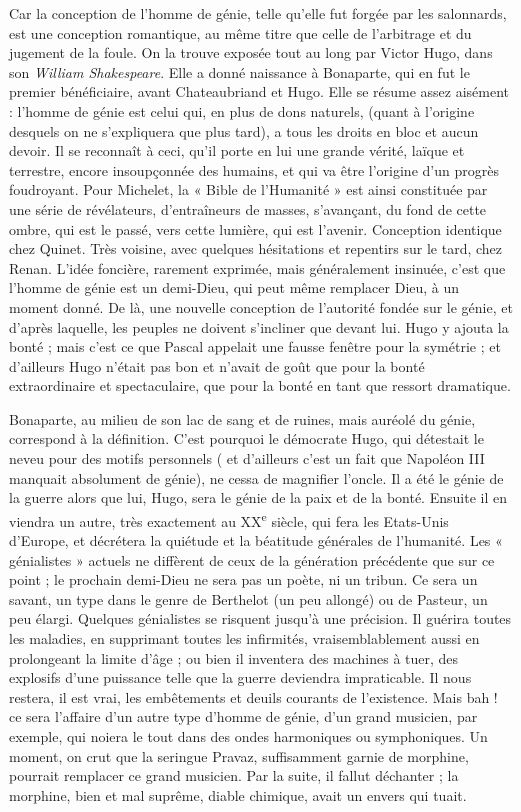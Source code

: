 \documentclass[french,twoside]{book} %
\begin{document}
Car la conception de l’homme de génie, telle qu’elle fut forgée par les salonnards, est une conception romantique, au même titre que celle de l’arbitrage et du jugement de la foule. On la trouve exposée tout au long par Victor Hugo, dans son {\itshape William Shakespeare}. Elle a donné naissance à Bonaparte, qui en fut le premier bénéficiaire, avant Chateaubriand et Hugo. Elle se résume assez aisément : l’homme de génie est celui qui, en plus de dons naturels, (quant à l’origine desquels on ne s’expliquera que plus tard), a tous les droits en bloc et aucun devoir. Il se reconnaît à ceci, qu’il porte en lui une grande vérité, laïque et terrestre, encore insoupçonnée des humains, et qui va être l’origine d’un progrès foudroyant. Pour Michelet, la « Bible de l’Humanité » est ainsi constituée par une série de révélateurs, d’entraîneurs de masses, s’avançant, du fond de cette ombre, qui est le passé, vers cette lumière, qui est l’avenir. Conception identique chez Quinet. Très voisine, avec quelques hésitations et repentirs sur le tard, chez Renan. L’idée foncière, rarement exprimée, mais généralement insinuée, c’est que l’homme de génie est un demi-Dieu, qui peut même remplacer Dieu, à un moment donné. De là, une nouvelle conception de l’autorité fondée sur le génie, et d’après laquelle, les peuples ne doivent s’incliner que devant lui. Hugo y ajouta la bonté ; mais c’est ce que Pascal appelait une fausse fenêtre pour la symétrie ; et d’ailleurs Hugo n’était pas bon et n’avait de goût que pour la bonté extraordinaire et spectaculaire, que pour la bonté en tant que ressort dramatique.\par
Bonaparte, au milieu de son lac de sang et de ruines, mais auréolé du génie, correspond à la définition. C’est pourquoi le démocrate Hugo, qui détestait le neveu pour des motifs personnels ( et d’ailleurs c’est un fait que Napoléon III manquait absolument de génie), ne cessa de magnifier l’oncle. Il a été le génie de la guerre alors que lui, Hugo, sera le génie de la paix et de la bonté. Ensuite il en viendra un autre, très exactement au XX\textsuperscript{e} siècle, qui fera les Etats-Unis d’Europe, et décrétera la quiétude et la béatitude générales de l’humanité. Les « génialistes » actuels ne diffèrent de ceux de la génération précédente que sur ce point ; le prochain demi-Dieu ne sera pas un poète, ni un tribun. Ce sera un savant, un type dans le genre de Berthelot (un peu allongé) ou de Pasteur, un peu élargi. Quelques génialistes se risquent jusqu’à une précision. Il guérira toutes les maladies, en supprimant toutes les infirmités, vraisemblablement aussi en prolongeant la limite d’âge ; ou bien il inventera des machines à tuer, des explosifs d’une puissance telle que la guerre deviendra impraticable. Il nous restera, il est vrai, les embêtements et deuils courants de l’existence. Mais bah ! ce sera l’affaire d’un autre type d’homme de génie, d’un grand musicien, par exemple, qui noiera le tout dans des ondes harmoniques ou symphoniques. Un moment, on crut que la seringue Pravaz, suffisamment garnie de morphine, pourrait remplacer ce grand musicien. Par la suite, il fallut déchanter ; la morphine, bien et mal suprême, diable chimique, avait un envers qui tuait.\par
\end{document}
